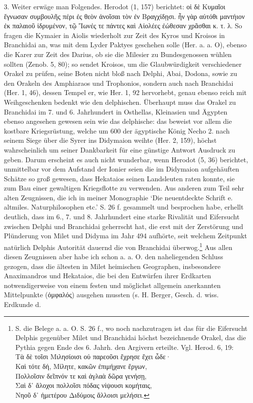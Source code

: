 \documentclass[a4paper, 11pt, oneside]{article}
\begin{document}
3. Weiter erwäge man Folgendes. Herodot (1, 157) berichtet: οἱ δὲ Κυμαῖοι ἔγνωσαν συμβουλῆς πέρι ἐς θεὸν ἀνοῖσαι τὸν ἐν Βραγχίδῃσι. ἦν γὰρ αὐτόθι μαντήιον ἐκ παλαιοῦ ἰδρυμένον, τῷ Ἴωνές τε πάντες καὶ Αἰολέες ἐώθεσαν χρᾶσθαι κ. τ. λ. So fragen die Kymaier in Aiolis wiederholt zur Zeit des Kyros und Kroisos in Branchidai an, was mit dem Lyder Paktyes geschehen solle (Her. a. a. O), ebenso die Karer zur Zeit des Darius, ob sie die Milesier zu Bundesgenossen wühlen sollten (Zenob. 5, 80); so sendet Kroisos, um die Glaubwürdigkeit verschiedener Orakel zu prüfen, seine Boten nicht bloß nach Delphi, Abai, Dodona, sowie zu den Orakeln des Amphiaraos und Trophonios, sondern auch nach Branchidai (Her. 1, 46), dessen Tempel er, wie Her. 1, 92 hervorhebt, genau ebenso reich mit Weihgeschenken bedenkt wie den delphischen. Überhaupt muss das Orakel zu Branchidai im 7. und 6. Jahrhundert in Osthellas, Kleinasien und Ägypten ebenso angesehen gewesen sein wie das delphische: das beweist vor allem die kostbare Kriegsrüstung, welche um 600 der ägyptische König Necho 2. nach seinem Siege über die Syrer ins Didymaion weihte (Her. 2, 159), höchst wahrscheinlich um seiner Dankbarkeit für eine günstige Antwort Ausdruck zu geben. Darum erscheint es auch nicht wunderbar, wenn Herodot (5, 36) berichtet, unmittelbar vor dem Aufstand der Ionier seien die im Didymaion aufgehäuften Schätze so groß gewesen, dass Hekataios seinen Landsleuten raten konnte, sie zum Bau einer gewaltigen Kriegsflotte zu verwenden. Aus anderen zum Teil sehr alten Zeugnissen, die ich in meiner Monographie `Die neuentdeckte Schrift e. altmiles. Naturphilosophen etc.' S. 26 f. gesammelt und besprochen habe, erhellt deutlich, dass im 6., 7. und 8. Jahrhundert eine starke Rivalität und Eifersucht zwischen Delphi und Branchidai geherrscht hat, die erst mit der Zerstörung und Plünderung von Milet und Didyma im Jahr 494 aufhörte, seit welchem Zeitpunkt natürlich Delphis Autorität dauernd die von Branchidai überwog.\footnote{S. die Belege a. a. O. S. 26 f., wo noch nachzutragen ist das für die Eifersucht Delphis gegenüber Milet und Branchidai höchst bezeichnende Orakel, das die Pythia gegen Ende des 6. Jahrh. den Argivern erteilte. Vgl. Herod. 6, 19:\\\hspace*{10mm}Τὰ δὲ τοῖσι Μιλησίοισι οὐ παρεοῦσι ἔχρησε ἔχει ὧδε·\\\hspace*{10mm}Καὶ τότε δή, Μίλητε, κακῶν ἐπιμήχανε ἔργων,\\\hspace*{10mm}Πολλοῖσιν δεῖπνόν τε καὶ ἀγλαὰ δῶρα γενήσῃ,\\\hspace*{10mm}Σαὶ δ᾽ ἄλοχοι πολλοῖσι πόδας νίψουσι κομήταις,\\\hspace*{10mm}Νηοῦ δ᾽ ἡμετέρου Διδύμοις ἄλλοισι μελήσει.} Aus allen diesen Zeugnissen aber habe ich schon a. a. O. den naheliegenden Schluss gezogen, dass die ältesten in Milet heimischen Geographen, insbesondere Anaximandros und Hekataios, die bei den Entwürfen ihrer Erdkarten notwendigerweise von einem festen und möglichst allgemein anerkannten Mittelpunkte (ὀμφαλός) ausgehen mussten (s. H. Berger, Gesch. d. wiss. Erdkunde d. 
\end{document}

